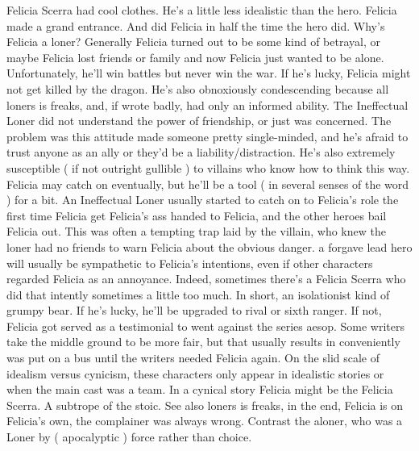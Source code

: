 \documentclass[12pt]{book}
\begin{document}
Felicia Scerra had cool clothes. He's a little less idealistic than the hero. Felicia made a grand entrance. And did Felicia in half the time the hero did. Why's Felicia a loner? Generally Felicia turned out to be some kind of betrayal, or maybe Felicia lost friends or family and now Felicia just wanted to be alone. Unfortunately, he'll win battles but never win the war. If he's lucky, Felicia might not get killed by the dragon. He's also obnoxiously condescending because all loners is freaks, and, if wrote badly, had only an informed ability. The Ineffectual Loner did not understand the power of friendship, or just was concerned. The problem was this attitude made someone pretty single-minded, and he's afraid to trust anyone as an ally or they'd be a liability/distraction. He's also extremely susceptible ( if not outright gullible ) to villains who know how to think this way. Felicia may catch on eventually, but he'll be a tool ( in several senses of the word ) for a bit. An Ineffectual Loner usually started to catch on to Felicia's role the first time Felicia get Felicia's ass handed to Felicia, and the other heroes bail Felicia out. This was often a tempting trap laid by the villain, who knew the loner had no friends to warn Felicia about the obvious danger. a forgave lead hero will usually be sympathetic to Felicia's intentions, even if other characters regarded Felicia as an annoyance. Indeed, sometimes there's a Felicia Scerra who did that intently  sometimes a little too much. In short, an isolationist kind of grumpy bear. If he's lucky, he'll be upgraded to rival or sixth ranger. If not, Felicia got served as a testimonial to went against the series aesop. Some writers take the middle ground to be more fair, but that usually results in conveniently was put on a bus until the writers needed Felicia again. On the slid scale of idealism versus cynicism, these characters only appear in idealistic stories or when the main cast was a team. In a cynical story Felicia might be the Felicia Scerra. A subtrope of the stoic. See also loners is freaks, in the end, Felicia is on Felicia's own, the complainer was always wrong. Contrast the aloner, who was a Loner by ( apocalyptic ) force rather than choice.
\end{document}
